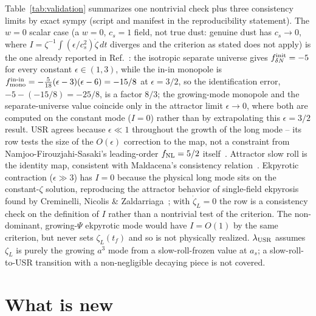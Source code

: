 \documentclass[aps,prd,twocolumn,superscriptaddress,showpacs,preprintnumbers,nofootinbib,longbibliography,floatfix]{revtex4-2}
\newcommand{\fnl}{f_{\rm NL}}
\newcommand{\eps}{\epsilon}
\begin{document}
Table~\ref{tab:validation} summarizes one nontrivial check plus three consistency limits by
exact sympy (script and manifest in the reproducibility statement). The $w=0$ scalar case
(a $w=0$, $c_s=1$ field, not true dust: genuine dust has $c_s\to0$, where
$I=\zeta^{-1}\int(\eps/c_s^2)\dot\zeta\,dt$ diverges and the criterion as stated does not
apply) is the one already reported in
Ref.~\cite{Golden2026Monopole}: the isotropic separate universe gives
$f_{\delta N}^{\rm init}=-5$ for every constant $\eps\in(1,3)$, while the in-in monopole is
$f^{\rm in\text{-}in}_{\rm mono}=-\tfrac{5}{18}(\eps-3)(\eps-6)=-15/8$ at $\eps=3/2$, so the
identification error, $-5-(-15/8)=-25/8$, is a factor $8/3$; the growing-mode monopole and
the separate-universe value coincide only in the attractor limit $\eps\to0$, where both are
computed on the constant mode ($I=0$) rather than by extrapolating this $\eps=3/2$ result.
USR agrees because $\eps\ll1$ throughout the growth of the long mode --
its row tests the size of the $O(\eps)$ correction to the map, not a constraint from
Namjoo-Firouzjahi-Sasaki's leading-order $\fnl=5/2$ itself~\cite{Namjoo2013}. Attractor slow
roll is the identity map, consistent with Maldacena's consistency
relation~\cite{Maldacena2003}. Ekpyrotic contraction ($\eps\gg3$) has $I=0$ because the
physical long mode sits on the constant-$\zeta$ solution, reproducing the attractor
behavior of single-field ekpyrosis found by Creminelli, Nicolis \&
Zaldarriaga~\cite{Creminelli2004}; with $\dot\zeta_L=0$ the row is a consistency check on
the definition of $I$ rather than a nontrivial test of the criterion. The non-dominant,
growing-$\Psi$ ekpyrotic mode would have $I=O(1)$ by the same criterion, but never sets
$\zeta_L(t_f)$ and so is not physically realized. $\lambda_{\rm USR}$ assumes $\zeta_L$ is
purely the growing $a^3$ mode from a slow-roll-frozen value at $a_s$; a slow-roll-to-USR
transition with a non-negligible decaying piece is not covered.

\section{What is new}
\end{document}
